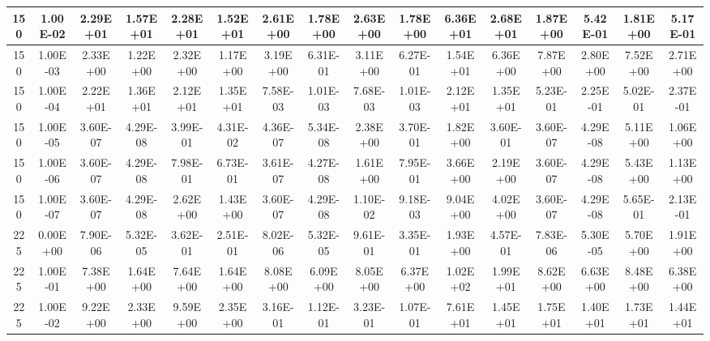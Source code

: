 \begin{table}[H]
\begin{center}
{\begin{tabular}{|c|c|c|c|c|c|c|c|c|c|c|c|c|c|c|c|}
150    &    1.00E-02    &    2.29E+01    &    1.57E+01    &    2.28E+01    &    1.52E+01    &    2.61E+00    &    1.78E+00    &    2.63E+00    &    1.78E+00    &    6.36E+01    &    2.68E+01    &    1.87E+00    &    5.42E-01    &    1.81E+00    &    5.17E-01    \\ \hline
150    &    1.00E-03    &    2.33E+00    &    1.22E+00    &    2.32E+00    &    1.17E+00    &    3.19E+00    &    6.31E-01    &    3.11E+00    &    6.27E-01    &    1.54E+01    &    6.36E+00    &    7.87E+00    &    2.80E+00    &    7.52E+00    &    2.71E+00    \\ \hline
150    &    1.00E-04    &    2.22E+01    &    1.36E+01    &    2.12E+01    &    1.35E+01    &    7.58E-03    &    1.01E-03    &    7.68E-03    &    1.01E-03    &    2.12E+01    &    1.35E+01    &    5.23E-01    &    2.25E-01    &    5.02E-01    &    2.37E-01    \\ \hline
150    &    1.00E-05    &    3.60E-07    &    4.29E-08    &    3.99E-01    &    4.31E-02    &    4.36E-07    &    5.34E-08    &    2.38E+00    &    3.70E-01    &    1.82E+00    &    3.60E-01    &    3.60E-07    &    4.29E-08    &    5.11E+00    &    1.06E+00    \\ \hline
150    &    1.00E-06    &    3.60E-07    &    4.29E-08    &    7.98E-01    &    6.73E-01    &    3.61E-07    &    4.27E-08    &    1.61E+00    &    7.95E-01    &    3.66E+00    &    2.19E+00    &    3.60E-07    &    4.29E-08    &    5.43E+00    &    1.13E+00    \\ \hline
150    &    1.00E-07    &    3.60E-07    &    4.29E-08    &    2.62E+00    &    1.43E+00    &    3.60E-07    &    4.29E-08    &    1.10E-02    &    9.18E-03    &    9.04E+00    &    4.02E+00    &    3.60E-07    &    4.29E-08    &    5.65E-01    &    2.13E-01    \\ \hline
225    &    0.00E+00    &    7.90E-06    &    5.32E-05    &    3.62E-01    &    2.51E-01    &    8.02E-06    &    5.32E-05    &    9.61E-01    &    3.35E-01    &    1.93E+00    &    4.57E-01    &    7.83E-06    &    5.30E-05    &    5.70E+00    &    1.91E+00    \\ \hline
225    &    1.00E-01    &    7.38E+00    &    1.64E+00    &    7.64E+00    &    1.64E+00    &    8.08E+00    &    6.09E+00    &    8.05E+00    &    6.37E+00    &    1.02E+02    &    1.99E+01    &    8.62E+00    &    6.63E+00    &    8.48E+00    &    6.38E+00    \\ \hline
225    &    1.00E-02    &    9.22E+00    &    2.33E+00    &    9.59E+00    &    2.35E+00    &    3.16E-01    &    1.12E-01    &    3.23E-01    &    1.07E-01    &    7.61E+01    &    1.45E+01    &    1.75E+01    &    1.40E+01    &    1.73E+01    &    1.44E+01    \\ \hline

\end{tabular}}
\end{center}
\end{table}
